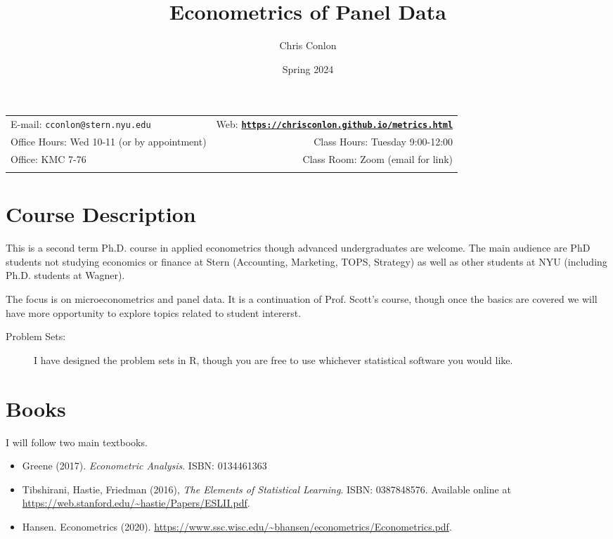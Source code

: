\documentclass[11pt]{article}
\title{Econometrics of Panel Data}\author{Chris Conlon}
\date{Spring 2024}
\newcommand{\blankline}{\quad\pagebreak[2]}
\begin{document}
\maketitle

\blankline

\begin{tabular*}{.93\textwidth}{@{\extracolsep{\fill}}lr}


  E-mail: \texttt{cconlon@stern.nyu.edu} & Web: \href{http://chrisconlon.org}{\tt\bf https://chrisconlon.github.io/metrics.html}  \\

 Office Hours: Wed 10-11 (or by appointment) &  Class Hours: Tuesday 9:00-12:00 \\


 Office: KMC 7-76  & Class Room: Zoom (email for link) \\
&  \\
\hline
\end{tabular*}

\vspace{10 mm}

\section*{Course Description}
This is a second term Ph.D. course in applied econometrics though advanced undergraduates are welcome. The main audience are PhD students not studying economics or finance at Stern (Accounting, Marketing, TOPS, Strategy) as well as other students at NYU (including Ph.D. students at Wagner).

The focus is on microeconometrics and panel data. It is a continuation of Prof. Scott's course, though once the basics are covered we will have more opportunity to explore topics related to student intererst. 

\begin{description}
\item[Problem Sets:] I have designed the problem sets in R, though you are free to use whichever statistical software you would like. 
\end{description}

\section*{Books}
I will follow two main textbooks.
\begin{itemize}
\item Greene (2017). \textit{Econometric Analysis}. ISBN: 0134461363
\item Tibshirani, Hastie, Friedman (2016), \textit{The Elements of Statistical Learning}. ISBN: 0387848576. Available online at \url{https://web.stanford.edu/~hastie/Papers/ESLII.pdf}.
\item Hansen. Econometrics (2020). \url{https://www.ssc.wisc.edu/~bhansen/econometrics/Econometrics.pdf}.
\end{itemize} 
\end{document}
